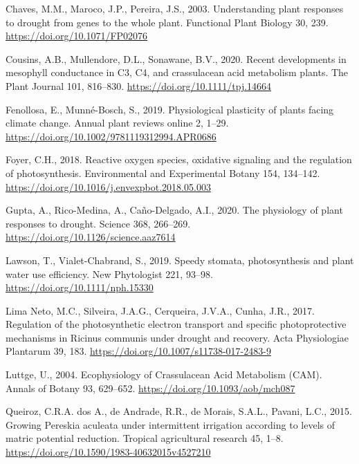 \documentclass[
  12pt,
  letterpaper,
  DIV=11,
  numbers=noendperiod]{scrartcl}
\newlength{\cslhangindent}
\newlength{\cslentryspacingunit} %
\newenvironment{CSLReferences}[2] %
 {%
  \setlength{\parindent}{0pt}
  \ifodd #1
  \let\oldpar\par
  \def\par{\hangindent=\cslhangindent\oldpar}
  \fi
  \setlength{\parskip}{#2\cslentryspacingunit}
 }%
 {}
\begin{document}
\hypertarget{refs}{}
\begin{CSLReferences}{1}{0}
\leavevmode{}%
Chaves, M.M., Maroco, J.P., Pereira, J.S., 2003. Understanding plant
responses to drought \textemdash{} from genes to the whole plant.
Functional Plant Biology 30, 239. \url{https://doi.org/10.1071/FP02076}

\leavevmode{}%
Cousins, A.B., Mullendore, D.L., Sonawane, B.V., 2020. Recent
developments in mesophyll conductance in C3, C4, and crassulacean acid
metabolism plants. The Plant Journal 101, 816--830.
\url{https://doi.org/10.1111/tpj.14664}

\leavevmode{}%
Fenollosa, E., Munné-Bosch, S., 2019. Physiological plasticity of plants
facing climate change. Annual plant reviews online 2, 1--29.
\url{https://doi.org/10.1002/9781119312994.APR0686}

\leavevmode{}%
Foyer, C.H., 2018. Reactive oxygen species, oxidative signaling and the
regulation of photosynthesis. Environmental and Experimental Botany 154,
134--142. \url{https://doi.org/10.1016/j.envexpbot.2018.05.003}

\leavevmode{}%
Gupta, A., Rico-Medina, A., Caño-Delgado, A.I., 2020. The physiology of
plant responses to drought. Science 368, 266--269.
\url{https://doi.org/10.1126/science.aaz7614}

\leavevmode{}%
Lawson, T., Vialet-Chabrand, S., 2019. Speedy stomata, photosynthesis
and plant water use efficiency. New Phytologist 221, 93--98.
\url{https://doi.org/10.1111/nph.15330}

\leavevmode{}%
Lima Neto, M.C., Silveira, J.A.G., Cerqueira, J.V.A., Cunha, J.R., 2017.
Regulation of the photosynthetic electron transport and specific
photoprotective mechanisms in {Ricinus} communis under drought and
recovery. Acta Physiologiae Plantarum 39, 183.
\url{https://doi.org/10.1007/s11738-017-2483-9}

\leavevmode{}%
Luttge, U., 2004. Ecophysiology of Crassulacean Acid Metabolism (CAM).
Annals of Botany 93, 629--652. \url{https://doi.org/10.1093/aob/mch087}

\leavevmode{}%
Queiroz, C.R.A. dos A., de Andrade, R.R., de Morais, S.A.L., Pavani,
L.C., 2015. Growing {Pereskia} aculeata under intermittent irrigation
according to levels of matric potential reduction. Tropical agricultural
research 45, 1--8. \url{https://doi.org/10.1590/1983-40632015v4527210}


\end{CSLReferences}
\end{document}

